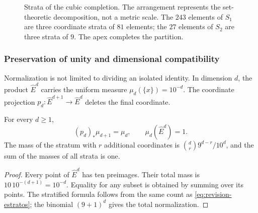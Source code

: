 \begin{figure}[htbp]
\centering
{}
\caption{Strata of the cubic completion. The arrangement represents
the set-theoretic decomposition, not a metric scale. The \(243\) elements
of \(S_1\) are three coordinate strata of \(81\) elements; the \(27\)
elements of \(S_2\) are three strata of \(9\). The apex completes the partition.}
\label{fig:revision-emrh}
\end{figure}



\subsubsection{Preservation of unity and dimensional compatibility}

Normalization is not limited to dividing an isolated identity. In dimension
\(d\), the product \(\widehat E^d\) carries the uniform measure
\(\mu_d(\{x\})=10^{-d}\). The coordinate projection
\(p_d:\widehat E^{d+1}\to\widehat E^d\) deletes the final coordinate.

\begin{proposition}
For every \(d\geq1\),
\[
 (p_d)_*\mu_{d+1}=\mu_d,
 \qquad \mu_d(\widehat E^d)=1.
\]
The mass of the stratum with \(r\) additional coordinates is
\(\binom dr9^{d-r}/10^d\), and the sum of the masses of all strata
is one.
\end{proposition}
\begin{proof}
Every point of \(\widehat E^d\) has ten preimages. Their total mass is
\(10\,10^{-(d+1)}=10^{-d}\). Equality for any subset
is obtained by summing over its points. The stratified formula follows
from the same count as \eqref{eq:revision-estratos}; the binomial
\((9+1)^d\) gives the total normalization.
\end{proof}

